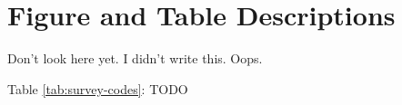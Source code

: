 \newpage
\appendix

\section*{Figure and Table Descriptions} \label{descrip}
Don't look here yet. I didn't write this. Oops.

Table \ref{tab:survey-codes}: TODO